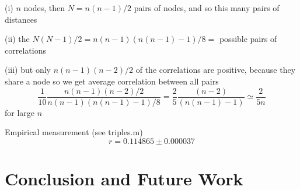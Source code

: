 \documentclass{article}
\begin{document}
(i) $n$ nodes, then $N = n (n-1)/2$ pairs of nodes, and so this many pairs of distances

(ii) the $N (N-1) /2 = n (n-1) (n (n-1) -1)/8 = $ possible pairs of
correlations

(iii) but only $n(n-1)(n-2)/2$ of the correlations are positive,
because they share a node so we get average correlation between all
pairs
 \[ \frac{1}{10} \frac{n(n-1)(n-2)/2}{n (n-1) (n (n-1) -1)/8} =
    \frac{2}{5} \frac{(n-2)}{(n (n-1) -1)}
   \simeq 
   \frac{2}{5n}
\]
for large $n$

Empirical measurement (see triples.m)
\[ r = 0.114865 \pm 0.000037\]


\section{Conclusion and Future Work}




\setlength{\parskip}{1mm}

% 

\end{document}
